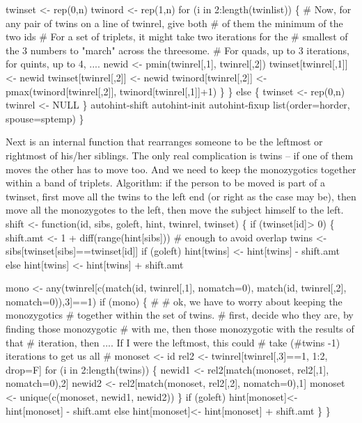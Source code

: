 \documentclass{article}
\begin{document}
        twinset <- rep(0,n)
        twinord <- rep(1,n)
        for (i in 2:length(twinlist)) \{
            # Now, for any pair of twins on a line of twinrel, give both
            #  of them the minimum of the two ids
            # For a set of triplets, it might take two iterations for the
            #  smallest of the 3 numbers to "march" across the threesome.
            #  For quads, up to 3 iterations, for quints, up to 4, ....
            newid <- pmin(twinrel[,1], twinrel[,2])
            twinset[twinrel[,1]] <- newid
            twinset[twinrel[,2]] <- newid
            twinord[twinrel[,2]] <- pmax(twinord[twinrel[,2]], 
                                         twinord[twinrel[,1]]+1)
            \}   
        \}
    else \{
        twinset <- rep(0,n)
        twinrel <- NULL
        \}
    \LA{}autohint-shift\RA{}
    \LA{}autohint-init\RA{}
    \LA{}autohint-fixup\RA{}
    list(order=horder, spouse=sptemp)    
    \}
\nwendcode{}\nwdocspar

Next is an internal function that  rearranges someone to be
the leftmost or rightmost of his/her siblings.  The only
real complication is twins -- if one of them moves the other has to move too.  
And we need to keep the monozygotics together within a band of triplets.
Algorithm: if the person to be moved is part of a twinset, 
first move all the twins to the left end (or right
as the case may be), then move all the monozygotes to the
left, then move the subject himself to the left.
\nwenddocs{}\endmoddef
shift <- function(id, sibs, goleft, hint, twinrel, twinset) \{
    if (twinset[id]> 0)  \{ 
        shift.amt <- 1 + diff(range(hint[sibs]))  # enough to avoid overlap
        twins <- sibs[twinset[sibs]==twinset[id]]
        if (goleft) 
         hint[twins] <- hint[twins] - shift.amt
        else hint[twins] <- hint[twins] + shift.amt
            
        mono  <- any(twinrel[c(match(id, twinrel[,1], nomatch=0),
                           match(id, twinrel[,2], nomatch=0)),3]==1)
        if (mono) \{
        #
        # ok, we have to worry about keeping the monozygotics
        #  together within the set of twins.
        # first, decide who they are, by finding those monozygotic
            #  with me, then those monozygotic with the results of that
            #  iteration, then ....  If I were the leftmost, this could
            #  take (#twins -1) iterations to get us all
            #
        monoset <- id
        rel2 <- twinrel[twinrel[,3]==1, 1:2, drop=F]
        for (i in 2:length(twins)) \{
            newid1 <- rel2[match(monoset, rel2[,1], nomatch=0),2]
            newid2 <- rel2[match(monoset, rel2[,2], nomatch=0),1]
            monoset <- unique(c(monoset, newid1, newid2))
            \}
        if (goleft) 
               hint[monoset]<- hint[monoset] - shift.amt
        else   hint[monoset]<- hint[monoset] + shift.amt
        \}
        \}
\end{document}
